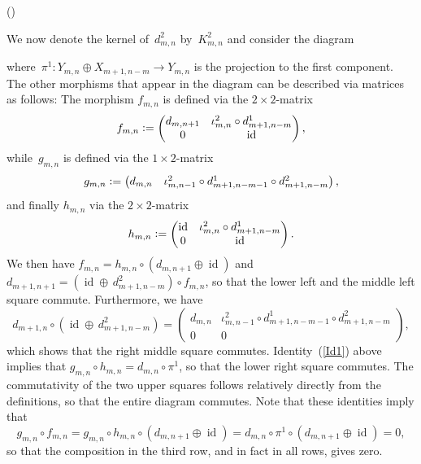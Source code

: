 \documentclass[12pt]{article}
\makeatletter
\newcounter{num}
\newenvironment{pflist}{\begin{list}{(\arabic{num})}{\usecounter{num} \leftmargin0cm \itemindent5pt}}{\end{list}}
\theoremstyle{definition}
\theoremstyle{break}
\renewenvironment{proof}[1][\proofname]{\par
\vspace{-5pt}%
\pushQED{\qed}%
\normalfont
\topsep0pt \partopsep0pt %
\trivlist
\item[\hskip\labelsep
\bfseries
#1\@addpunct{.}]\ignorespaces
}{%
\popQED\endtrivlist\@endpefalse
\addvspace{6pt plus 6pt} %
}
\DeclareMathOperator\id{id}
\renewcommand{\1}{\mathbbm{1}}
\newcommand{\deq}{\vcentcolon =}
\makeatother
\begin{document}
\begin{proof}
\begin{pflist}
\item
We now denote the kernel of~$d^2_{m,n}$ by~$K^2_{m,n}$ and consider the diagram
\begin{center}
\end{center}
where~$\pi^1 \colon Y_{m,n} \oplus X_{m+1,n-m} \to Y_{m,n}$ is the projection to the first component. The other morphisms that appear in the diagram can be described via matrices as follows: The morphism $f_{m,n}$ is defined via the
$2 \times 2$-matrix
\[f_{m,n} \deq \begin{pmatrix}
d_{m,n+1} & \iota^2_{m,n} \circ d^1_{m+1,n-m} \\
0 & \id
\end{pmatrix},\]
while~$g_{m,n}$ is defined via the $1 \times 2$-matrix
\[g_{m,n} \deq \begin{pmatrix}
d_{m,n} & \iota^2_{m,n-1} \circ d^1_{m+1,n-m-1} \circ d^2_{m+1,n-m}
\end{pmatrix},
\]
and finally $h_{m,n}$ via the $2 \times 2$-matrix
\[h_{m,n} \deq \begin{pmatrix}
\id & \iota^2_{m,n} \circ d^1_{m+1,n-m} \\
0 & \id
\end{pmatrix}.\]
We then have $f_{m,n} = h_{m,n} \circ (d_{m,n+1} \oplus \id)$ and
\mbox{$d_{m+1,n+1} = (\id \oplus \, d^2_{m+1,n-m}) \circ f_{m,n}$}, so that the lower left and the middle left square commute. Furthermore, we have
\[d_{m+1,n} \circ (\id \oplus \, d^2_{m+1,n-m})  =
\begin{pmatrix}
d_{m,n} & \iota^2_{m,n-1} \circ d^1_{m+1,n-m-1} \circ d^2_{m+1,n-m}\\
0 & 0
\end{pmatrix},\]
which shows that the right middle square commutes. Identity~(\ref{Id1}) above implies that $g_{m,n} \circ h_{m,n} = d_{m,n} \circ \pi^1$, so that the lower right square commutes. The commutativity of the two upper squares follows relatively directly from the definitions, so that the entire diagram commutes. Note that these identities imply that
\[g_{m,n} \circ f_{m,n} = g_{m,n} \circ h_{m,n} \circ (d_{m,n+1} \oplus \id)
= d_{m,n} \circ \pi^1 \circ (d_{m,n+1} \oplus \id) = 0,\]
so that the composition in the third row, and in fact in all rows, gives zero.


\end{pflist}
\end{proof}
\end{document}
